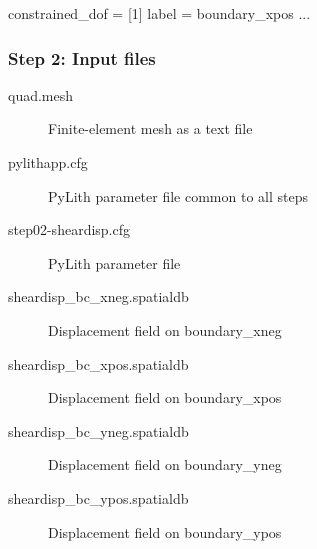 \documentclass[aspectratio=169]{beamer}
\begin{document}
\begin{frame}[t,fragile]
\begin{minipage}[t]{0.60\textwidth}
\begin{onlyenv}
\begin{cfgcode}
        constrained_dof = [1]
        label = boundary_xpos
        ...
      \end{cfgcode}
    \end{onlyenv}
  \end{minipage}

    

  
\end{frame}


\begin{frame}
  \frametitle{Step 2: Input files}
  \summary{}

  \begin{description}
  \item[quad.mesh] Finite-element mesh as a text file
  \item[pylithapp.cfg] PyLith parameter file common to all steps
  \item[step02-sheardisp.cfg] PyLith parameter file
  \item[sheardisp\_bc\_xneg.spatialdb] Displacement field on boundary\_xneg
  \item[sheardisp\_bc\_xpos.spatialdb] Displacement field on boundary\_xpos
  \item[sheardisp\_bc\_yneg.spatialdb] Displacement field on boundary\_yneg
  \item[sheardisp\_bc\_ypos.spatialdb] Displacement field on boundary\_ypos
  \end{description}
    
\end{frame}
\end{document}
